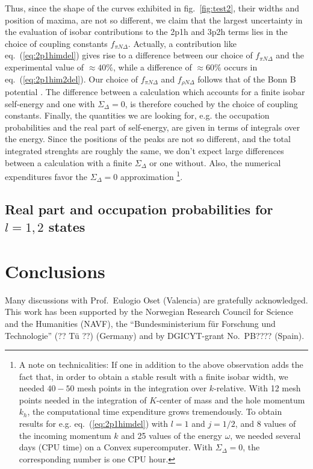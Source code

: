 Thus, since the shape of the curves exhibited
in fig.\ \ref{fig:test2}, their widths and position of maxima, are not so
different, we claim that the largest uncertainty in the evaluation
of isobar contributions to the 2p1h and 3p2h terms lies in the choice of
coupling constants $f_{\pi N\Delta}$. Actually, a contribution like
eq.\ (\ref{eq:2p1himdel}) gives rise to a difference between our choice
of $f_{\pi N\Delta  }$ and the experimental value of $\approx 40\%$, while a
difference of $\approx 60\% $ occurs in eq.\ (\ref{eq:2p1him2del}).
Our choice of $f_{\pi N\Delta}$ and $f_{\rho N\Delta}$ follows that of the
Bonn B potential \cite{mac89}.
The difference between a calculation which
accounts for a finite isobar self-energy and one with $\Sigma_{\Delta}=0$, is
therefore couched by the choice of coupling constants.
Finally, the quantities we are looking for, e.g. the occupation
probabilities and the real part of self-energy, are given in terms of integrals
over the energy. Since the positions of the peaks are not so different, 
and the total integrated
strenghts are roughly the same, we don't expect large differences between
a calculation with a finite $\Sigma_{\Delta}$ or one without. Also, the 
numerical expenditures favor the $\Sigma_{\Delta}=0$ approximation
\footnote{A note on
technicalities: If one in addition to the above observation
adds the fact that, in order to obtain
a stable result with a finite isobar width, we needed
$40-50$ mesh points in the integration over $k$-relative. With
12 mesh points needed in the integration of $K$-center of mass and the hole
momentum $k_h$, the computational time expenditure grows tremendously.
To obtain results for e.g. eq.\ (\ref{eq:2p1himdel}) with $l=1$ and $j=1/2$,
and 8 values of the incoming momentum $k$ and 25 values of the energy $\omega$,
we needed several
days (CPU time) on a Convex supercomputer. With $\Sigma_{\Delta}=0$,
the corresponding number is one CPU hour.}.







\subsection{Real part and occupation probabilities for $l=1,2$ states}




\section{Conclusions}
Many discussions with Prof.\ Eulogio Oset (Valencia) are gratefully
acknowledged.
This work has been supported by the Norwegian Research
Council for Science and the Humanities (NAVF), the
``Bundesministerium f\"ur Forschung und
Technologie'' (?? T\"u ??) (Germany) and
by DGICYT-grant No.\ PB???? (Spain).


